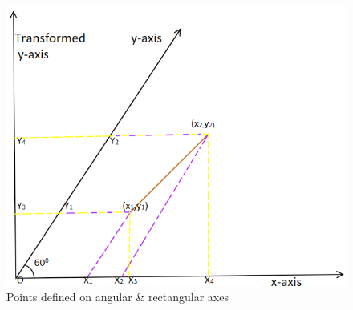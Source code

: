 \begin{figure}[!ht]
	\centering
	\includegraphics[width=\columnwidth]{2/solution/2/1/fig1.png}
	\caption{Points defined on angular \& rectangular axes}
    \label{2/solution/2/1Fig1: Points plotted in Python}

	\end{figure}
	
